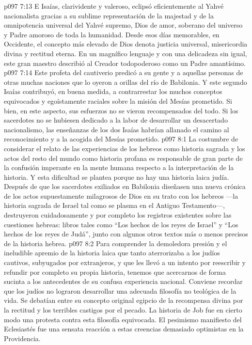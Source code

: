 \vs p097 7:13 E Isaías, clarividente y valeroso, eclipsó eficientemente al Yahvé nacionalista gracias a su sublime representación de la majestad y de la omnipotencia universal del Yahvé supremo, Dios de amor, soberano del universo y Padre amoroso de toda la humanidad. Desde esos días memorables, en Occidente, el concepto más elevado de Dios denota justicia universal, misericordia divina y rectitud eterna. En un magnífico lenguaje y con una delicadeza sin igual, este gran maestro describió al Creador todopoderoso como un Padre amantísimo.
\vs p097 7:14 Este profeta del cautiverio predicó a su gente y a aquellas personas de otras muchas naciones que lo oyeron a orillas del río de Babilonia. Y este segundo Isaías contribuyó, en buena medida, a contrarrestar los muchos conceptos equivocados y egoístamente raciales sobre la misión del Mesías prometido. Si bien, en este aspecto, sus esfuerzos no se vieron recompensados del todo. Si los sacerdotes no se hubiesen dedicado a la labor de desarrollar un desacertado nacionalismo, las enseñanzas de los dos Isaías habrían allanado el camino al reconocimiento y a la acogida del Mesías prometido.
\vs p097 8:1 La costumbre de considerar el relato de las experiencias de los hebreos como historia sagrada y los actos del resto del mundo como historia profana es responsable de gran parte de la confusión imperante en la mente humana respecto a la interpretación de la historia. Y esta dificultad se plantea porque no hay una historia laica judía. Después de que los sacerdotes exiliados en Babilonia diseñasen una nueva crónica de los actos supuestamente milagrosos de Dios en su trato con los hebreos ---la historia sagrada de Israel tal como se plasma en el Antiguo Testamento---, destruyeron cuidadosamente y por completo los registros existentes sobre las cuestiones hebreas: libros tales como “Los hechos de los reyes de Israel” y “Los hechos de los reyes de Judá”, junto con algunos otros textos más o menos precisos de la historia hebrea.
\vs p097 8:2 Para comprender la demoledora presión y el ineludible apremio de la historia laica que tanto aterrorizaba a los judíos cautivos, subyugados por extranjeros, y que les llevó a un intento por reescribir y refundir por completo su propia historia, tenemos que acercarnos de forma sucinta a los antecedentes de su confusa experiencia nacional. Conviene recordar que los judíos no lograron desarrollar una adecuada filosofía no teológica de la vida. Se debatían entre su concepto original egipcio de la recompensa divina por la rectitud y los terribles castigos por el pecado. La historia de Job fue en cierto modo una protesta contra esta filosofía equivocada. El pesimismo manifiesto del Eclesiastés fue una sensata reacción a estas creencias demasiado optimistas en la Providencia.
